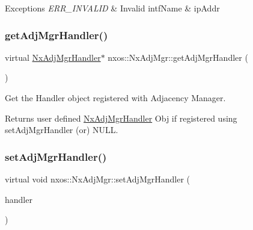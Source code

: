 \begin{DoxyExceptions}{Exceptions}
{\em E\+R\+R\+\_\+\+I\+N\+V\+A\+L\+ID} & Invalid intf\+Name \& ip\+Addr \\
\hline
\end{DoxyExceptions}
\mbox{\label{classnxos_1_1_nx_adj_mgr_a0a25f49f42b92d373d341d3b013c7404}} 
\subsubsection{\texorpdfstring{get\+Adj\+Mgr\+Handler()}{getAdjMgrHandler()}}
{\footnotesize\ttfamily virtual \mbox{\hyperlink{classnxos_1_1_nx_adj_mgr_handler}{Nx\+Adj\+Mgr\+Handler}}$\ast$ nxos\+::\+Nx\+Adj\+Mgr\+::get\+Adj\+Mgr\+Handler (\begin{DoxyParamCaption}{ }\end{DoxyParamCaption})\hspace{0.3cm}{\ttfamily [pure virtual]}}

Get the Handler object registered with Adjacency Manager.

\begin{DoxyReturn}{Returns}
user defined \mbox{\hyperlink{classnxos_1_1_nx_adj_mgr_handler}{Nx\+Adj\+Mgr\+Handler}} Obj if registered using set\+Adj\+Mgr\+Handler (or) N\+U\+LL. 
\end{DoxyReturn}
\mbox{\label{classnxos_1_1_nx_adj_mgr_afc37b95ddfe24357cfd0803cad8feb74}} 
\subsubsection{\texorpdfstring{set\+Adj\+Mgr\+Handler()}{setAdjMgrHandler()}}
{\footnotesize\ttfamily virtual void nxos\+::\+Nx\+Adj\+Mgr\+::set\+Adj\+Mgr\+Handler (\begin{DoxyParamCaption}\item[{\mbox{\hyperlink{classnxos_1_1_nx_adj_mgr_handler}{Nx\+Adj\+Mgr\+Handler}} $\ast$}]{handler }\end{DoxyParamCaption})\hspace{0.3cm}{\ttfamily [pure virtual]}}

